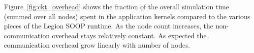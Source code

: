 Figure~\ref{fig:ckt_overhead} shows the fraction of the overall simulation time (summed over
all nodes) spent in the application kernels compared to the various pieces of the Legion
SOOP runtime.  As the node count increases, the non-communication overhead stays relatively constant.
As expected the communication overhead grow linearly with number of nodes.

\begin{figure}


\end{figure}
